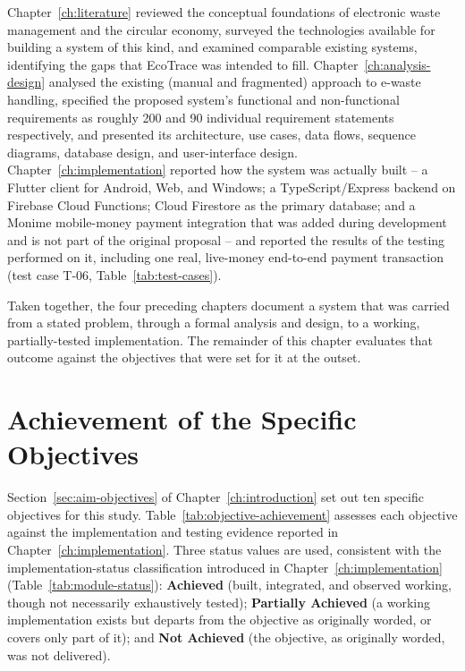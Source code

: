 Chapter~\ref{ch:literature} reviewed the conceptual foundations of
electronic waste management and the circular economy, surveyed the
technologies available for building a system of this kind, and examined
comparable existing systems, identifying the gaps that EcoTrace was intended
to fill. Chapter~\ref{ch:analysis-design} analysed the existing (manual and
fragmented) approach to e-waste handling, specified the proposed system's
functional and non-functional requirements as roughly 200 and 90 individual
requirement statements respectively, and presented its architecture, use
cases, data flows, sequence diagrams, database design, and user-interface
design. Chapter~\ref{ch:implementation} reported how the system was actually
built -- a Flutter client for Android, Web, and Windows; a TypeScript/Express
backend on Firebase Cloud Functions; Cloud Firestore as the primary
database; and a Monime mobile-money payment integration that was added
during development and is not part of the original proposal -- and reported
the results of the testing performed on it, including one real, live-money
end-to-end payment transaction (test case T-06, Table~\ref{tab:test-cases}).

Taken together, the four preceding chapters document a system that was
carried from a stated problem, through a formal analysis and design, to a
working, partially-tested implementation. The remainder of this chapter
evaluates that outcome against the objectives that were set for it at the
outset.

\section{Achievement of the Specific Objectives}
\label{sec:achievement-objectives}

Section~\ref{sec:aim-objectives} of Chapter~\ref{ch:introduction} set out
ten specific objectives for this study. Table~\ref{tab:objective-achievement}
assesses each objective against the implementation and testing evidence
reported in Chapter~\ref{ch:implementation}. Three status values are used,
consistent with the implementation-status classification introduced in
Chapter~\ref{ch:implementation} (Table~\ref{tab:module-status}):
\textbf{Achieved} (built, integrated, and observed working, though not
necessarily exhaustively tested); \textbf{Partially Achieved} (a working
implementation exists but departs from the objective as originally worded,
or covers only part of it); and \textbf{Not Achieved} (the objective, as
originally worded, was not delivered).

